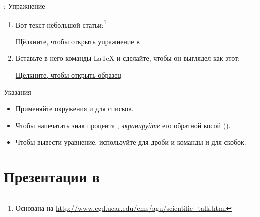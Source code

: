 \documentclass{beamer}
\begin{document}
\begin{frame}[fragile]{\insertsection: Упражнение}
\vspace{-3ex}
\begin{enumerate}
\item Вот текст небольшой статьи:\footnote{Основана на \url{http://www.cgd.ucar.edu/cms/agu/scientific_talk.html}}
\begin{printout}
\href{\wlnewdoc{recap-exercise.tex}}{%
Щёлкните, чтобы открыть упражнение в \wllogo{}}
\end{printout}
\item Вставьте в него команды \LaTeX{} и сделайте, чтобы он выглядел как этот:
\begin{printout}
\href{\fileuri/recap-exercise-solution.pdf}{%
Щёлкните, чтобы открыть образец}
\end{printout}
\end{enumerate}
\begin{tblock}{Указания}
\begin{itemize}
\item Применяйте окружения  и  для списков.
\item Чтобы напечатать знак процента \keystrokebftt{\%}, \emph{экранируйте} его обратной косой (\cmdbs{\%}).
\item Чтобы вывести уравнение, используйте  для дроби и команды
   и  для скобок.
\end{itemize}
\end{tblock}
\vspace{5pt}
\end{frame}

\section{Презентации в \protect{}}
\end{document}
